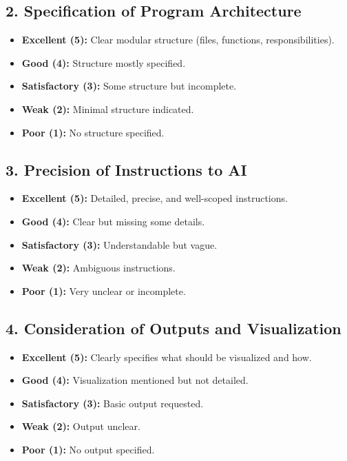 \documentclass[paper=letter, fontsize=12pt]{article}
\numberwithin{equation}{section}
\begin{document}
\subsection*{2. Specification of Program Architecture}

\begin{itemize}
\item \textbf{Excellent (5):} Clear modular structure (files, functions, responsibilities).
\item \textbf{Good (4):} Structure mostly specified.
\item \textbf{Satisfactory (3):} Some structure but incomplete.
\item \textbf{Weak (2):} Minimal structure indicated.
\item \textbf{Poor (1):} No structure specified.
\end{itemize}

\subsection*{3. Precision of Instructions to AI}

\begin{itemize}
\item \textbf{Excellent (5):} Detailed, precise, and well-scoped instructions.
\item \textbf{Good (4):} Clear but missing some details.
\item \textbf{Satisfactory (3):} Understandable but vague.
\item \textbf{Weak (2):} Ambiguous instructions.
\item \textbf{Poor (1):} Very unclear or incomplete.
\end{itemize}

\subsection*{4. Consideration of Outputs and Visualization}

\begin{itemize}
\item \textbf{Excellent (5):} Clearly specifies what should be visualized and how.
\item \textbf{Good (4):} Visualization mentioned but not detailed.
\item \textbf{Satisfactory (3):} Basic output requested.
\item \textbf{Weak (2):} Output unclear.
\item \textbf{Poor (1):} No output specified.
\end{itemize}
\end{document}
